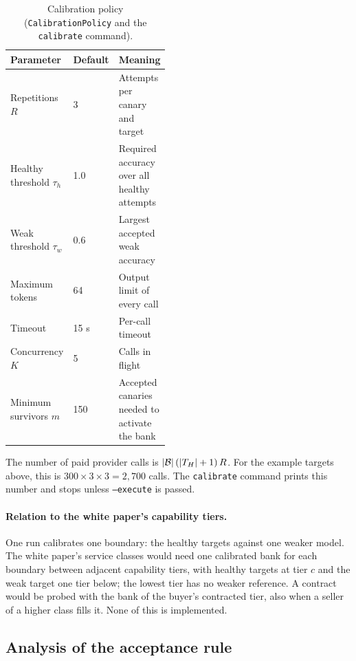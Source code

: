 \begin{table}[htbp]
  \centering
  \small
  \begin{tabularx}{\linewidth}{@{}p{0.34\linewidth}p{0.12\linewidth}X@{}}
    \toprule
    Parameter & Default & Meaning \\
    \midrule
    Repetitions $R$ & 3 & Attempts per canary and target \\
    Healthy threshold $\tau_h$ & 1.0 & Required accuracy over all healthy
      attempts \\
    Weak threshold $\tau_w$ & 0.6 & Largest accepted weak accuracy \\
    Maximum tokens & 64 & Output limit of every call \\
    Timeout & 15 s & Per-call timeout \\
    Concurrency $K$ & 5 & Calls in flight \\
    Minimum survivors $m$ & 150 & Accepted canaries needed to activate the bank
      \\
    \bottomrule
  \end{tabularx}
  \caption{Calibration policy (\texttt{CalibrationPolicy} and the
  \texttt{calibrate} command).}
  \label{tab:calibration_params}
\end{table}

The number of paid provider calls is $|\mathcal{B}|\,(|T_H| + 1)\,R$. For the example
targets above, this is $300 \times 3 \times 3 = 2{,}700$ calls. The
\texttt{calibrate} command prints this number and stops unless
\texttt{--execute} is passed.

\paragraph{Relation to the white paper's capability tiers.} One run
calibrates one boundary: the healthy targets against one weaker model. The
white paper's service classes would need one calibrated bank for each boundary
between adjacent capability tiers, with healthy targets at tier $c$ and the
weak target one tier below; the lowest tier has no weaker reference. A contract
would be probed with the bank of the buyer's contracted tier, also when a
seller of a higher class fills it. None of this is implemented.

\subsection{Analysis of the acceptance rule}
\label{sec:calibration_analysis}

